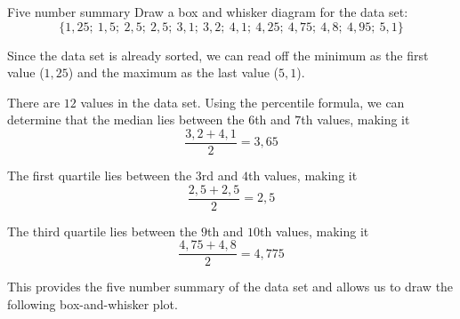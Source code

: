 \begin{wex}{Five number summary}{
    Draw a box and whisker diagram for the data set:
    \begin{equation}
      \{1,25;\ 1,5;\ 2,5;\ 2,5;\ 3,1;\ 3,2;\ 4,1;\ 4,25;\ 4,75;\ 4,8;\ 4,95;\ 5,1\}
    \end{equation}
}{

  Since the data set is already sorted, we can read off the minimum as
  the first value ($1,25$) and the maximum as the last value ($5,1$).


  There are $12$ values in the data set. Using the percentile formula,
  we can determine that the median lies between the $6$th and $7$th
  values, making it
  \begin{equation}
    \frac{3,2 + 4,1}{2} = 3,65
  \end{equation}

  The first quartile lies between the $3$rd and $4$th values, making
  it
  \begin{equation}
    \frac{2,5 + 2,5}{2} = 2,5
  \end{equation}

  The third quartile lies between the $9$th and $10$th values, making
  it
  \begin{equation}
    \frac{4,75 + 4,8}{2} = 4,775
  \end{equation}

  This provides the five number summary of the data set and allows us
  to draw the following box-and-whisker plot.

  \begin{center}
  \end{center}
}
\end{wex}

